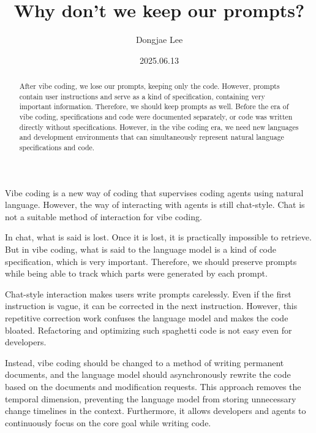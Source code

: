 \documentclass[11pt, oneside]{article}
\title{Why don't we keep our prompts?}
\author{Dongjae Lee}
\date{2025.06.13}
\begin{document}
\maketitle

\begin{abstract}
	After vibe coding, we lose our prompts, keeping only the code.
	However, prompts contain user instructions and serve as a kind of specification, containing very important information.
	Therefore, we should keep prompts as well. Before the era of vibe coding, specifications and code were documented separately, or code was written directly without specifications.
	However, in the vibe coding era, we need new languages and development environments that can simultaneously represent natural language specifications and code.
\end{abstract}

Vibe coding is a new way of coding that supervises coding agents using natural language.
However, the way of interacting with agents is still chat-style.
Chat is not a suitable method of interaction for vibe coding.

In chat, what is said is lost. Once it is lost, it is practically impossible to retrieve.
But in vibe coding, what is said to the language model is a kind of code specification, which is very important.
Therefore, we should preserve prompts while being able to track which parts were generated by each prompt.

Chat-style interaction makes users write prompts carelessly.
Even if the first instruction is vague, it can be corrected in the next instruction.
However, this repetitive correction work confuses the language model and makes the code bloated.
Refactoring and optimizing such spaghetti code is not easy even for developers.

Instead, vibe coding should be changed to a method of writing permanent documents,
and the language model should asynchronously rewrite the code based on the documents and modification requests.
This approach removes the temporal dimension, preventing the language model from storing unnecessary change timelines in the context.
Furthermore, it allows developers and agents to continuously focus on the core goal while writing code.
\end{document}
